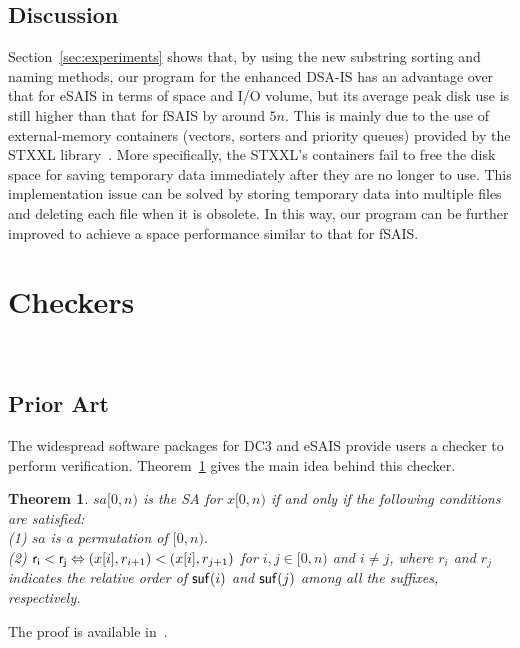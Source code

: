 \documentclass[10pt,journal,compsoc]{IEEEtran}
\newtheorem{theorem}{Theorem}[section]
\begin{document}
\subsection{Discussion} \label{subsec:further_discussion}

Section~\ref{sec:experiments} shows that, by using the new substring sorting and naming methods, our program for the enhanced  DSA-IS has an advantage over that for eSAIS in terms of space and I/O volume, but its average peak disk use is still higher than that for fSAIS by around $5n$. This is mainly due to the use of external-memory containers (vectors, sorters and priority queues) provided by the STXXL library~\cite{Dementiev2007}. More specifically, the STXXL's containers fail to free the disk space for saving temporary data immediately after they are no longer to use. This implementation issue can be solved by storing temporary data into multiple files and deleting each file when it is obsolete. In this way, our program can be further improved to achieve a space performance similar to that for fSAIS.

\section{Checkers}~\label{sec:checkers}

\subsection{Prior Art} \label{sec:checkers:prior_art}
The widespread software packages for DC3 and eSAIS provide users a checker to perform verification. Theorem~\ref{theorem:1} gives the main idea behind this checker. 

\begin{theorem} \label{theorem:1}
	$sa[0, n)$ is the SA for $x[0, n)$ if and only if the following conditions are satisfied:\\
	(1) $sa$ is a permutation of $[0, n)$. \\	
	(2) ${\sf r_i < r_j} \Leftrightarrow (x[i], r_{i + 1}) < (x[i], r_{j + 1})$ for $ i, j \in [0, n)$ and $i\ne j$, where $r_i$ and $r_j$ indicates the relative order of ${\sf suf}(i)$ and ${\sf suf}(j)$ among all the suffixes, respectively. \\
\end{theorem}

\begin{IEEEproof}
	The proof is available in~\cite{Dementiev2008a}.
\end{IEEEproof}
\end{document}
